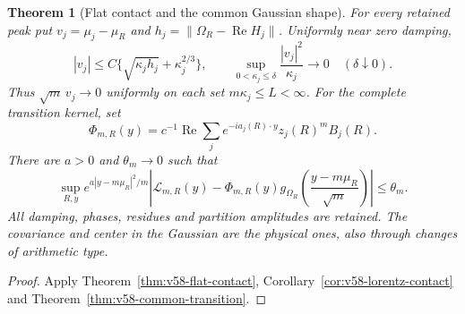 \documentclass[11pt,reqno]{amsart}
\numberwithin{equation}{section}
\newtheorem{leadtheorem}{Theorem}
\theoremstyle{definition}\newtheorem{definition}[theorem]{Definition}
\theoremstyle{remark}\newtheorem{remark}[theorem]{Remark}
\begin{document}
\begin{leadtheorem}[Flat contact and the common Gaussian shape]
\label{thm:intro-v58-contact}
For every retained peak put $v_j=\mu_j-\mu_R$ and
$h_j=\|\Omega_R-\operatorname{Re}H_j\|$. Uniformly near zero damping,
\[
 |v_j|\le C\{\sqrt{\kappa_jh_j}+\kappa_j^{2/3}\},\qquad
 \sup_{0<\kappa_j\le\delta}\frac{|v_j|^2}{\kappa_j}\longrightarrow0
                 \quad(\delta\downarrow0).
\]
Thus $\sqrt m\,v_j\to0$ uniformly on each set $m\kappa_j\le L<\infty$.
For the complete transition kernel, set
\[
 \Phi_{m,R}(y)=c^{-1}\operatorname{Re}
             \sum_j e^{-ia_j(R)\cdot y}z_j(R)^mB_j(R).
\]
There are $a>0$ and $\theta_m\to0$ such that
\[
 \sup_{R,y}e^{a|y-m\mu_R|^2/m}
 \left|\mathcal L_{m,R}(y)-\Phi_{m,R}(y)
           g_{\Omega_R}\left(\frac{y-m\mu_R}{\sqrt m}\right)\right|
                                                      \le\theta_m.
\]
All damping, phases, residues and partition amplitudes are retained.
The covariance and center in the Gaussian are the physical ones,
also through changes of arithmetic type.
\end{leadtheorem}
\begin{proof}
Apply Theorem~\ref{thm:v58-flat-contact},
Corollary~\ref{cor:v58-lorentz-contact} and
Theorem~\ref{thm:v58-common-transition}.
\end{proof}
\end{document}
